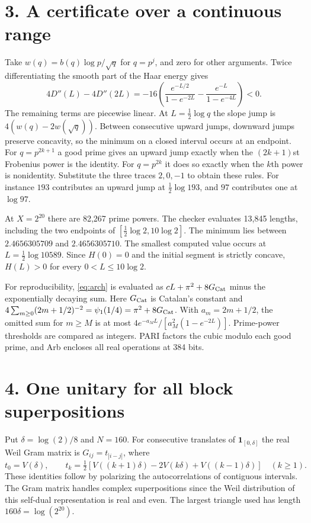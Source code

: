 \documentclass[11pt]{article}
\begin{document}
\newpage
\section*{3. A certificate over a continuous range}
Take $w(q)=b(q)\log p/\sqrt q$ for $q=p^j$, and zero for other arguments.
Twice differentiating the smooth part of the Haar energy gives
\[
 4D''(L)-4D''(2L)=-16\left(
 \frac{e^{-L/2}}{1-e^{-2L}}-\frac{e^{-L}}{1-e^{-4L}}\right)<0 .
\]
The remaining terms are piecewise linear. At $L=\frac12\log q$ the slope
jump is $4(w(q)-2w(\sqrt q))$. Between consecutive upward jumps, downward
jumps preserve concavity, so the minimum on a closed interval occurs at
an endpoint. For $q=p^{2k+1}$ a good prime gives an upward jump exactly
when the $(2k+1)$st Frobenius power is the identity. For $q=p^{2k}$ it
does so exactly when the $k$th power is nonidentity. Substitute the three
traces $2,0,-1$ to obtain these rules. For instance $193$ contributes an
upward jump at $\tfrac12\log193$, and $97$ contributes one at $\log97$.

At $X=2^{20}$ there are 82,267 prime powers. The checker evaluates 13,845
lengths, including the two endpoints of $[\tfrac12\log2,10\log2]$.
The minimum lies between $2.4656305709$ and $2.4656305710$.
The smallest computed value occurs at $L=\tfrac12\log10589$. Since $H(0)=0$
and the initial segment is strictly concave, $H(L)>0$ for every
$0<L\le10\log 2$.

For reproducibility, \eqref{eq:arch} is evaluated as $cL+\pi^2+8G_{\rm Cat}$
minus the exponentially decaying sum. Here $G_{\rm Cat}$ is Catalan's
constant and $4\sum_{m\ge0}(2m+1/2)^{-2}=\psi_1(1/4)=\pi^2+8G_{\rm Cat}$.
With $a_m=2m+1/2$, the omitted sum for $m\ge M$ is at most
$4e^{-a_M L}/[a_M^2(1-e^{-2L})]$. Prime-power thresholds are compared
as integers. PARI factors the cubic modulo each good prime, and Arb
encloses all real operations at 384 bits.

\section*{4. One unitary for all block superpositions}
Put $\delta=\log(2)/8$ and $N=160$. For consecutive translates of
$\mathbf1_{[0,\delta]}$ the real Weil Gram matrix is $G_{ij}=t_{|i-j|}$,
where
\[
 t_0=V(\delta),\qquad
 t_k=\tfrac12[V((k+1)\delta)-2V(k\delta)+V((k-1)\delta)]\quad(k\ge1).
\]
These identities follow by polarizing the autocorrelations of contiguous
intervals. The Gram matrix handles complex superpositions since the Weil
distribution of this self-dual representation is real and even. The
largest triangle used has length $160\delta=\log(2^{20})$.
\end{document}
